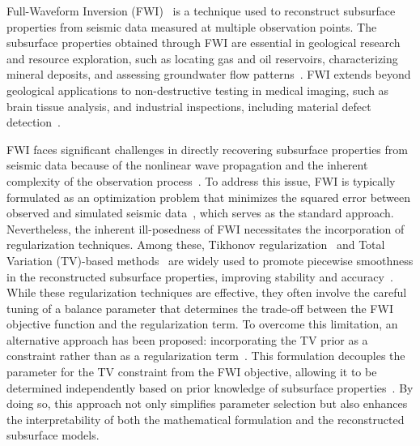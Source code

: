 Full-Waveform Inversion (FWI)~\cite{FWI0,FWI1} is a technique used to reconstruct subsurface properties from seismic data measured at multiple observation points.
The subsurface properties obtained through FWI are essential in geological research and resource exploration, such as locating gas and oil reservoirs, characterizing mineral deposits, and assessing groundwater flow patterns~\cite{FWI1,FWIApplicationGroundwater0,FWIApplicationGroundwater1}.
FWI extends beyond geological applications to non-destructive testing in medical imaging, such as brain tissue analysis, and industrial inspections, including material defect detection~\cite{FWIApplicationNonDestructiveTesting0,FWIApplicationNonDestructiveTesting1}.

FWI faces significant challenges in directly recovering subsurface properties from seismic data because of the nonlinear wave propagation and the inherent complexity of the observation process~\cite{FWI1}.
To address this issue, FWI is typically formulated as an optimization problem that minimizes the squared error between observed and simulated seismic data~\mbox{\cite{FWI0,CustomFWI0,CustomFWI1,CustomFWI2,CustomFWI3,CustomFWI4,CustomFWI5}}, which serves as the standard approach.
Nevertheless, the inherent ill-posedness of FWI necessitates the incorporation of regularization techniques.
Among these, Tikhonov regularization~\cite{tikhonov} and Total Variation (TV)-based methods~\cite{TV,TGV} are widely used to promote piecewise smoothness in the reconstructed subsurface properties, improving stability and accuracy~\cite{FWI-with-tikhonov-regularization,FWI-with-TV-regularization,FWI-with-directional-TV-regularization,FWI-with-high-order-TV-regularization,FWI-with-TGV-regularization}.
While these regularization techniques are effective, they often involve the careful tuning of a balance parameter that determines the trade-off between the FWI objective function and the regularization term.
To overcome this limitation, an alternative approach has been proposed: incorporating the TV prior as a constraint rather than as a regularization term~\cite{FWI-with-TV-constraint,FWI-with-TV-constraint2,FWI-with-TV-constraint3,FWI-with-TV-constraint4}.
This formulation decouples the parameter for the TV constraint from the FWI objective, allowing it to be determined independently based on prior knowledge of subsurface properties~\cite{constraint0,constraint1,constraint2,constraint3,constraint4,constraints-vs-penalties-in-FWI}.
By doing so, this approach not only simplifies parameter selection but also enhances the interpretability of both the mathematical formulation and the reconstructed subsurface models.


